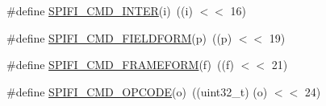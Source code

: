\begin{DoxyCompactItemize}
\item 
\#define \hyperlink{group___l_p_c_s_p_i_f_i_l_i_b___h_w___p_r_i_m_ga6ba616a9213dff16023f9b5b52c0f07e}{S\+P\+I\+F\+I\+\_\+\+C\+M\+D\+\_\+\+I\+N\+T\+ER}(i)~((i) $<$$<$ 16)
\item 
\#define \hyperlink{group___l_p_c_s_p_i_f_i_l_i_b___h_w___p_r_i_m_ga3fa2803ce803501ed89aeb51a9ff1715}{S\+P\+I\+F\+I\+\_\+\+C\+M\+D\+\_\+\+F\+I\+E\+L\+D\+F\+O\+RM}(p)~((p) $<$$<$ 19)
\item 
\#define \hyperlink{group___l_p_c_s_p_i_f_i_l_i_b___h_w___p_r_i_m_ga588e2c6094c256d799970bdad73cfd6a}{S\+P\+I\+F\+I\+\_\+\+C\+M\+D\+\_\+\+F\+R\+A\+M\+E\+F\+O\+RM}(f)~((f) $<$$<$ 21)
\item 
\#define \hyperlink{group___l_p_c_s_p_i_f_i_l_i_b___h_w___p_r_i_m_ga39b31bb8811dbd645fcbc13e3260bdad}{S\+P\+I\+F\+I\+\_\+\+C\+M\+D\+\_\+\+O\+P\+C\+O\+DE}(o)~((uint32\+\_\+t) (o) $<$$<$ 24)
\end{DoxyCompactItemize}
